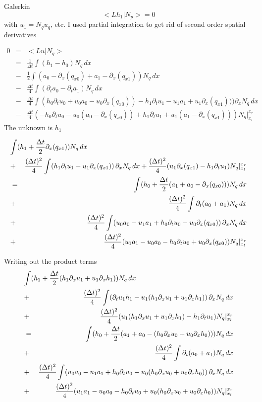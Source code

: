\documentclass[10pt,a4paper]{book}
\newcommand{\p}{\partial}
\begin{document}
Galerkin
\[
< L h_1 | N_p> =0
\]
with $u_1=N_q u_q$, etc. I used partial integration to get rid of second order spatial derivatives

\begin{eqnarray*}
0 &=& < L u | N_q > \\
&=& \frac{1}{\Delta t} \int (h_1-h_0) N_q \, dx \\
&-& \frac{1}{2} \int (a_0 -\p_x( q_{x0}) + a_1 -\p_x(q_{x1} )) N_q \, dx \\
&-& \frac{\Delta t}{4} \int (  \p_t a_0 -  \p_t a_1 ) N_q \, dx \\
&-& \frac{\Delta t}{4} \int ( h_0 \p_t u_0 +u_0  a_0- u_0 \p_x (q_{x0})) -h_1 \p_t u_1 - u_1 a_1+ u_1 \p_x (q_{x1}))) \p_x N_q \, dx \\
&-& \frac{\Delta t}{4} ( -h_0 \p_t u_0 - u_0 (a_0-\p_x (q_{x0})) + h_1 \p_t u_1 +u_1 (a_1-\p_x (q_{x1}))) N_q |_{x_l}^{x_r}
\end{eqnarray*}
The unknown is $h_1$


\begin{eqnarray*}
\lefteqn{\int (h_1  
+ \frac{\Delta t}{2}  \p_x (q_{x1} ) ) N_q   \, dx }\\
&+&  \frac{(\Delta t)^2}{4}  \int (h_1 \p_t u_1 -u_1 \p_x (q_{x1})) \, \p_x N_q \, dx
+ \frac{(\Delta t)^2}{4} (u_1 \p_x (q_{x1}) -h_1 \p_t u_1) N_q |_{x_l}^{x_r}\\
&=& \int ( h_0  + \frac{\Delta t}{2} (a_1+ a_0 -\p_x( q_{x0}))) N_q  \, dx \\
&+&   \frac{(\Delta t)^2}{4}  \int   \p_t (a_0+a_1 ) N_q \, dx \\
&+& \frac{(\Delta t)^2}{4} \int ( u_0 a_0 - u_1 a_1 +h_0 \p_t u_0 - u_0 \p_x (q_{x0})) \, \p_x N_q \, dx \\
&+& \frac{(\Delta t)^2}{4} ( u_1 a_1 -u_0 a_0 -h_0 \p_t u_0 +u_0 \p_x (q_{x0})) N_q |_{x_l}^{x_r}
\end{eqnarray*}


Writing out the product terms 
\begin{eqnarray*}
\lefteqn{\int (h_1  
+ \frac{\Delta t}{2}  ( h_1 \p_x u_1 + u_1 \p_x h_1 ) ) N_q   \, dx }\\
&+&  \frac{(\Delta t)^2}{4}  \int (\p_t u_1 h_1 -u_1 (h_1 \p_x u_1 + u_1 \p_x h_1) ) \, \p_x N_q \, dx \\
&+& \frac{(\Delta t)^2}{4} (u_1 (h_1 \p_x u_1 + u_1 \p_x h_1)- h_1 \p_t u_1) N_q |_{x_l}^{x_r}\\
&=& \int ( h_0  + \frac{\Delta t}{2} (a_1+ a_0 -(h_0 \p_x u_0 + u_0 \p_x h_0))) N_q  \, dx \\
&+&   \frac{(\Delta t)^2}{4}  \int   \p_t (a_0+a_1 ) N_q \, dx \\
&+& \frac{(\Delta t)^2}{4} \int ( u_0 a_0 - u_1 a_1 + h_0 \p_t u_0 - u_0 (h_0 \p_x u_0 + u_0 \p_x h_0)) \, \p_x N_q \, dx \\
&+& \frac{(\Delta t)^2}{4} ( u_1 a_1 -u_0 a_0 -h_0 \p_t u_0 +u_0 (h_0 \p_x u_0 + u_0 \p_x h_0)) N_q |_{x_l}^{x_r}
\end{eqnarray*}
\end{document}

